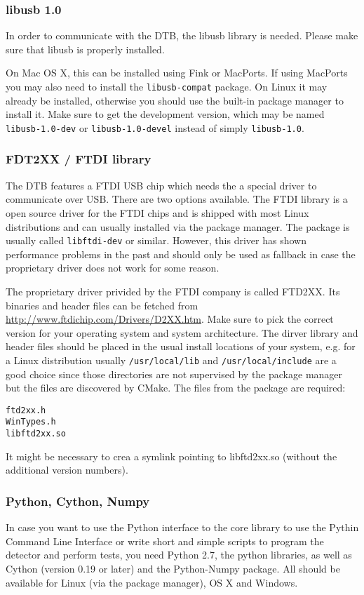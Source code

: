 \subsubsection{libusb 1.0}
In order to communicate with the \gls{DTB}, the libusb library is needed. Please make sure that libusb is properly installed.

On Mac OS X, this can be installed using Fink or MacPorts. If using MacPorts you may also need to install the \texttt{libusb-compat} package. On Linux it may already be installed, otherwise you should use the built-in package manager to install it.
Make sure to get the development version, which may be named \texttt{libusb-1.0-dev} or \texttt{libusb-1.0-devel} instead of simply \texttt{libusb-1.0}.

\subsubsection{FDT2XX / FTDI library}
The DTB features a FTDI USB chip which needs the a special driver to communicate over USB. There are two options available. The FTDI library is a open source driver for the FTDI chips and is shipped with most Linux distributions and can usually installed via the package manager. The package is usually called \texttt{libftdi-dev} or similar. However, this driver has shown performance problems in the past and should only be used as fallback in case the proprietary driver does not work for some reason.

The proprietary driver privided by the FTDI company is called FTD2XX. Its binaries and header files can be fetched from \url{http://www.ftdichip.com/Drivers/D2XX.htm}. Make sure to pick the correct version for your operating system and system architecture. The dirver library and header files should be placed in the usual install locations of your system, e.g. for a Linux distribution usually \texttt{/usr/local/lib} and \texttt{/usr/local/include} are a good choice since those directories are not supervised by the package manager but the files are discovered by CMake. The files from the package are required:
\begin{verbatim}
ftd2xx.h
WinTypes.h
libftd2xx.so
\end{verbatim}
It might be necessary to crea a symlink pointing to libftd2xx.so (without the additional version numbers).

\subsubsection{Python, Cython, Numpy}
In case you want to use the Python interface to the \pxar core library to use the Pythin Command Line Interface or write short and simple scripts to program the detector and perform tests, you need Python 2.7, the python libraries, as well as Cython (version 0.19 or later) and the Python-Numpy package. All should be available for Linux (via the package manager), OS X and Windows.


